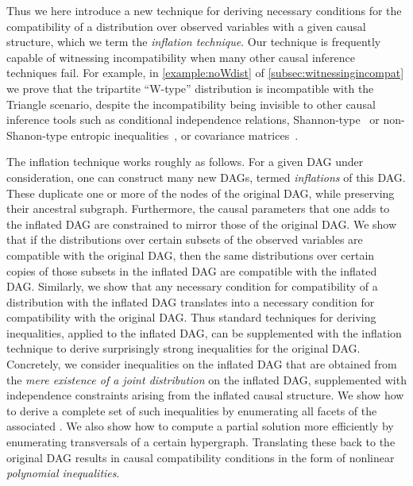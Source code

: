 Thus we here introduce a new technique for deriving necessary conditions for the compatibility of a distribution over observed variables with a given causal structure, which we term the {\em inflation technique}. Our technique is frequently capable of witnessing incompatibility when many other causal inference techniques fail. For example, in \cref{example:noWdist} of \cref{subsec:witnessingincompat} we prove that the tripartite ``W-type'' distribution is incompatible with the Triangle scenario, despite the incompatibility being invisible to other causal inference tools such as conditional independence relations, Shannon-type~\cite{fritz2013marginal,chaves2014novel,chaves2014informationinference} or non-Shanon-type entropic inequalities~\cite{weilenmann2016entropic}, or covariance matrices~\cite{kela2016covariance}.


The inflation technique works roughly as follows. For a given DAG under consideration, one can construct many new DAGs, termed {\em inflations} of this DAG. These duplicate one or more of the nodes of the original DAG, while preserving their ancestral subgraph.  Furthermore, the causal parameters that one adds to the inflated DAG are constrained to mirror those of the original DAG.  We show that if the distributions over certain subsets of the observed variables are compatible with the original DAG, then the same distributions over certain copies of those subsets in the inflated DAG are compatible with the inflated DAG.  Similarly, we show that any necessary condition for compatibility of a distribution with the inflated DAG translates into a necessary condition for compatibility with the original DAG.  Thus standard techniques for deriving inequalities, applied to the inflated DAG, can be supplemented with the inflation technique to derive surprisingly strong inequalities for the original DAG.  Concretely, we consider inequalities on the inflated DAG that are obtained from the \emph{mere existence of a joint distribution} on the inflated DAG, supplemented with independence constraints arising from the inflated causal structure.   We show how to derive a complete set of such inequalities by enumerating all facets of the associated . We also show how to compute a partial solution more efficiently by enumerating transversals of a certain hypergraph. Translating these back to the original DAG results in causal compatibility conditions in the form of nonlinear \emph{polynomial inequalities}.

